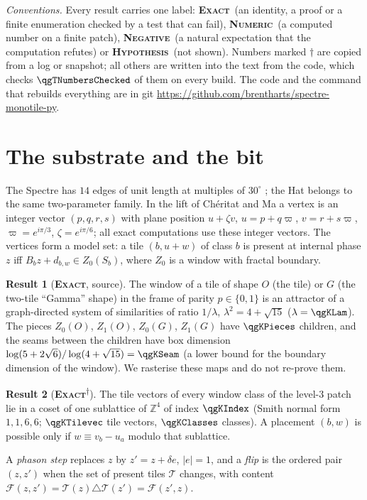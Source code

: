 \documentclass[11pt]{article}
\newcommand{\exact}{\textbf{\textsc{Exact}}}
\newcommand{\numeric}{\textbf{\textsc{Numeric}}}
\newcommand{\hypo}{\textbf{\textsc{Hypothesis}}}
\newcommand{\negres}{\textbf{\textsc{Negative}}}
\newcommand{\snap}{\textsuperscript{$\dagger$}}      %
\theoremstyle{definition}
\newtheorem{result}{Result}
\begin{document}
\emph{Conventions.} Every result carries one label: \exact\ (an identity, a proof or a finite enumeration checked by a test that can fail), \numeric\ (a computed number on a finite patch), \negres\ (a natural expectation that the computation refutes) or \hypo\ (not shown). Numbers marked $\dagger$ are copied from a log or snapshot; all others are written into the text from the code, which checks $\qgTNumbersChecked$ of them on every build. The code and the command that rebuilds everything are in git \url{https://github.com/brentharts/spectre-monotile-py}.

\section{The substrate and the bit}\label{sec:model}
The Spectre has $14$ edges of unit length at multiples of $30^\circ$ \cite{smith2023}; the Hat \cite{smith2024hat} belongs to the same two-parameter family. In the lift of Ch\'eritat and Ma \cite{cheritat2023} a vertex is an integer vector $(p,q,r,s)$ with plane position $u+\zeta v$, $u=p+q\varpi$, $v=r+s\varpi$, $\varpi=e^{i\pi/3}$, $\zeta=e^{i\pi/6}$; all exact computations use these integer vectors. The vertices form a model set: a tile $(b,u{+}w)$ of class $b$ is present at internal phase $z$ iff $B_bz+d_{b,w}\in Z_0(S_b)$, where $Z_0$ is a window with fractal boundary.
\begin{result}[\exact, source]\label{res:window-pieces}
The window of a tile of shape $O$ (the tile) or $G$ (the two-tile ``Gamma'' shape) in the frame of parity $p\in\{0,1\}$ is an attractor of a graph-directed system of similarities of ratio $1/\lambda$, $\lambda^2=4+\sqrt{15}$ ($\lambda=\qgKLam$). The pieces $Z_0(O)$, $Z_1(O)$, $Z_0(G)$, $Z_1(G)$ have $\qgKPieces$ children, and the seams between the children have box dimension $\log(5+2\sqrt6)/\log(4+\sqrt{15})=\qgKSeam$ (a lower bound for the boundary dimension of the window). We rasterise these maps and do not re-prove them.
\end{result}
\begin{result}[\exact\snap]\label{res:index36}
The tile vectors of every window class of the level-$3$ patch lie in a coset of one sublattice of $\mathbb{Z}^4$ of index $\qgKIndex$ (Smith normal form $1,1,6,6$; $\qgKTilevec$ tile vectors, $\qgKClasses$ classes). A placement $(b,w)$ is possible only if $w\equiv v_b-u_a$ modulo that sublattice.
\end{result}
A \emph{phason step} replaces $z$ by $z'=z+\delta e$, $|e|=1$, and a \emph{flip} is the ordered pair $(z,z')$ when the set of present tiles $\mathcal{T}$ changes, with content $\mathcal{F}(z,z')=\mathcal{T}(z)\triangle\mathcal{T}(z')=\mathcal{F}(z',z)$.
\end{document}
